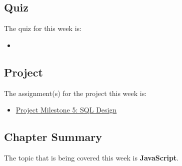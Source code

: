 \subsection{Quiz}

The quiz for this week is:

\begin{itemize}
    \item {}
\end{itemize}

\subsection{Project}

The assignment(s) for the project this week is:

\begin{itemize}
    \item \href{https://applied.cs.colorado.edu/mod/assign/view.php?id=61422}{Project Milestone 5: SQL Design}
\end{itemize}

\subsection{Chapter Summary}

The topic that is being covered this week is \textbf{JavaScript}.

